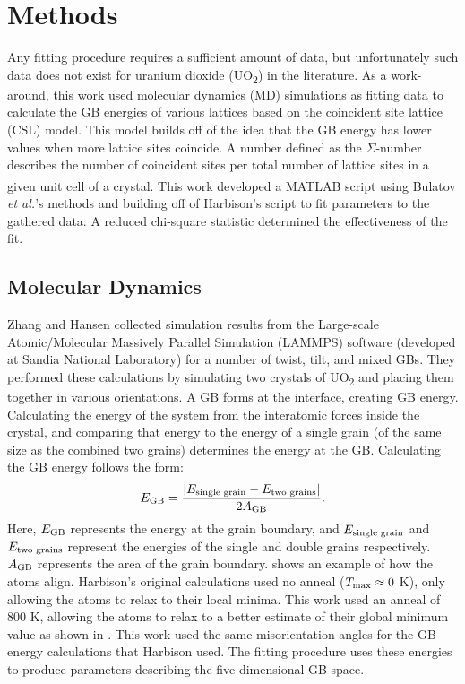 \documentclass[12pt]{report}
\begin{document}
\chapter{Methods\label{methods}}
Any fitting procedure requires a sufficient amount of data, but unfortunately such data does not exist for uranium dioxide (UO\textsubscript{2}) in the literature.  As a work-around, this work used molecular dynamics (MD) simulations\cite{zhang2016,hansen2016} as fitting data to calculate the GB energies of various lattices based on the coincident site lattice (CSL) model. This model builds off of the idea that the GB energy has lower values when more lattice sites coincide.  A number defined as the $\Sigma$-number describes the number of coincident sites per total number of lattice sites in a given unit cell of a crystal.\cite{lejcek2010, rohrer2011} This work developed a MATLAB\textsuperscript{\textregistered} script using Bulatov \emph{et al.}'s methods\cite{bulatov2014} and building off of Harbison's script\cite{harbison2015} to fit parameters to the gathered data.  A reduced chi-square statistic determined the effectiveness of the fit.

\section{Molecular Dynamics\label{methods:MD}}
Zhang\cite{zhang2016} and Hansen\cite{hansen2016} collected simulation results from the Large-scale Atomic/Molecular Massively Parallel Simulation (LAMMPS) software (developed at Sandia National Laboratory\cite{plimpton1995}) for a number of twist, tilt, and mixed GBs.  They performed these calculations by simulating two crystals of UO\textsubscript{2} and placing them together in various orientations.  A GB forms at the interface, creating GB energy.  Calculating the energy of the system from the interatomic forces inside the crystal, and comparing that energy to the energy of a single grain (of the same size as the combined two grains) determines the energy at the GB.\cite{harbison2015}  Calculating the GB energy follows the form:\cite{butterfield2013}
\begin{equation}\label{eq:GBE}
E_{\textnormal{GB}}=\frac{|E_{\textnormal{single grain}} - E_{\textnormal{two grains}}|}{2A_{\textnormal{GB}}}.
\end{equation} 
Here, $E_{\textnormal{GB}}$ represents the energy at the grain boundary, and $E_{\textnormal{single grain}}$ and $E_{\textnormal{two grains}}$ represent the energies of the single and double grains respectively.  $A_{\textnormal{GB}}$ represents the area of the grain boundary.   shows an example of how the atoms align. Harbison's original calculations\cite{harbison2015} used no anneal ($T_{\textnormal{max}}\approx0$ K), only allowing the atoms to relax to their local minima.  This work used an anneal of 800 K, allowing the atoms to relax to a better estimate of their global minimum value as shown in .  This work used the same misorientation angles for the GB energy calculations that Harbison used.  The fitting procedure uses these energies to produce parameters describing the five-dimensional GB space.
\end{document}
